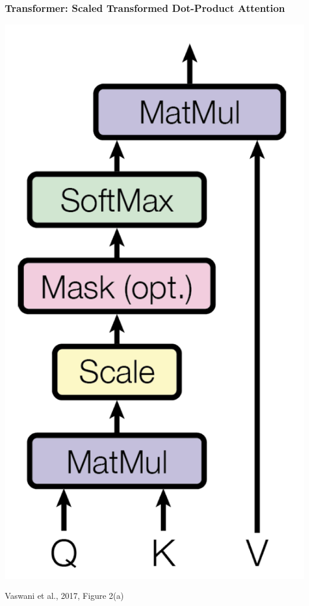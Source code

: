 \documentclass{beamer}
\begin{document}
\begin{frame}
  \frametitle{Transformer: Scaled Transformed Dot-Product Attention}

  \begin{center}
    \includegraphics[height=0.8\textheight]{figs/vaswani2017fig2a.png}

    \begin{tiny}
      Vaswani et al., 2017, Figure 2(a)
    \end{tiny}
  \end{center}
\end{frame}
\end{document}
